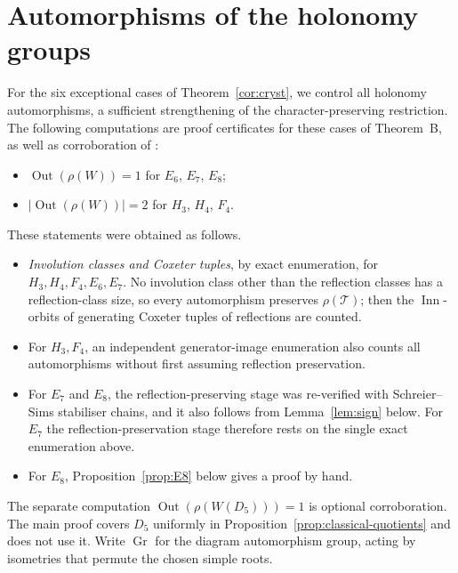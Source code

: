 \documentclass[11pt]{amsart}
\theoremstyle{definition}
\newcommand{\T}{\mathcal{T}}
\newcommand{\Out}{\operatorname{Out}}
\newcommand{\Inn}{\operatorname{Inn}}
\newcommand{\Gr}{\operatorname{Gr}}
\begin{document}
\section{Automorphisms of the holonomy groups}\label{app:out}

For the six exceptional cases of Theorem~\ref{cor:cryst}, we control all holonomy automorphisms, a sufficient
strengthening of the character-preserving restriction. The following computations are proof certificates
for these cases of Theorem~B, as well as corroboration of \cite[Thm.~31]{FH03}:
\begin{itemize}
\item $\Out(\rho(W))=1$ for $E_6$, $E_7$, $E_8$;
\item $|\Out(\rho(W))|=2$ for $H_3$, $H_4$, $F_4$.
\end{itemize}
These statements were obtained as follows.
\begin{itemize}
\item \emph{Involution classes and Coxeter tuples}, by exact enumeration, for $H_3,H_4,F_4,E_6,E_7$.
No involution class other than the reflection classes has a reflection-class size, so every automorphism preserves
$\rho(\T)$; then the $\Inn$-orbits of generating Coxeter tuples of reflections are counted.
\item For $H_3,F_4$, an independent generator-image enumeration also counts all automorphisms
without first assuming reflection preservation.
\item For $E_7$ and $E_8$, the reflection-preserving stage was re-verified with Schreier--Sims stabiliser chains, and
it also follows from Lemma~\ref{lem:sign} below. For $E_7$ the reflection-preservation stage therefore rests on the
single exact enumeration above.
\item For $E_8$, Proposition~\ref{prop:E8} below gives a proof by hand.
\end{itemize}

The separate computation $\Out(\rho(W(D_5)))=1$ is optional corroboration.
The main proof covers $D_5$ uniformly in Proposition~\ref{prop:classical-quotients} and does not use it.
Write $\Gr$ for the diagram automorphism group, acting by isometries that permute the chosen simple roots.
\end{document}
